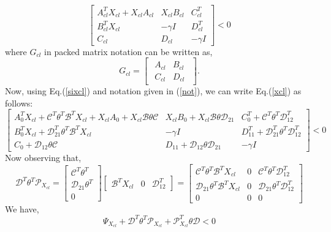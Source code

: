 \documentclass[a4paper,12pt]{article}
\begin{document}
		\begin{equation}
		\begin{bmatrix}
		A_{cl}^{T}X_{cl}+X_{cl}A_{cl} & X_{cl}B_{cl} & C_{cl}^{T} \\
			B_{cl}^{T}X_{cl} & -\gamma I & D_{cl}^{T} \\
			C_{cl} & D_{cl} & -\gamma I
		\end{bmatrix}
		< 0
		\label{xcl}
		\end{equation}
		where $G_{cl}$ in packed matrix notation can be written as,
		\[
		G_{cl}= \begin{bmatrix}
		\begin{array}{c|c}
	A_{cl} & B_{cl}\\ \hline
	C_{cl}
	 & D_{cl}
	\end{array}
	\end{bmatrix}.
	\]
	Now, using Eq.(\ref{sixcl}) and notation given in (\ref{not}), we can write Eq.(\ref{xcl}) as follows:
	\[
	\begin{bmatrix}
	A_{0}^{T}X_{cl} + \mathscr{C}^{T}\theta^{T}\mathscr{B}^{T}X_{cl} + X_{cl}A_{0}+X_{cl}\mathscr{B}\theta\mathscr{C} & X_{cl}B_{0} + X_{cl}\mathscr{B}\theta\mathscr{D}_{21} & C_{0}^{T} + \mathscr{C}^{T}\theta^{T}\mathscr{D}_{12}^{T} \\
	B_{0}^{T}X_{cl} + \mathscr{D}_{21}^{T}\theta^{T}\mathscr{B}^{T}X_{cl} & -\gamma I & D_{11}^{T} + \mathscr{D}_{21}^{T}\theta^{T}\mathscr{D}_{12}^{T} \\
	C_{0} + \mathscr{D}_{12}\theta\mathscr{C} & D_{11} + \mathscr{D}_{12}\theta\mathscr{D}_{21} & -\gamma I 
	\end{bmatrix}
	<0
	\]
	Now observing that,
	\[
	\mathscr{D}^{T}\theta^{T}\mathscr{P}_{X_{cl}} = 
	\begin{bmatrix}
	\mathscr{C}^{T}\theta^{T} \\ \mathscr{D}_{21}\theta^{T} \\ 0
	\end{bmatrix}
	\begin{bmatrix}
	\mathscr{B}^{T}X_{cl} & 0 & \mathscr{D}_{12}^{T}
	\end{bmatrix}
	=
	\begin{bmatrix}
	\mathscr{C}^{T}\theta^{T}\mathscr{B}^{T}X_{cl} & 0 & \mathscr{C}^{T}\theta^{T}\mathscr{D}_{12}^{T} \\
	\mathscr{D}_{21}\theta^{T}\mathscr{B}^{T}X_{cl} & 0 & \mathscr{D}_{21}\theta^{T}\mathscr{D}_{12}^{T}\\
	0 & 0 & 0
	\end{bmatrix}
	\]
	We have,
	\begin{equation}
	\Psi_{X_{cl}} + \mathscr{D}^{T}\theta^{T}\mathscr{P}_{X_{cl}} + \mathscr{P}_{X_{cl}}^{T}\theta\mathscr{D} < 0 
	\label{A}
	\end{equation}
\end{document}
